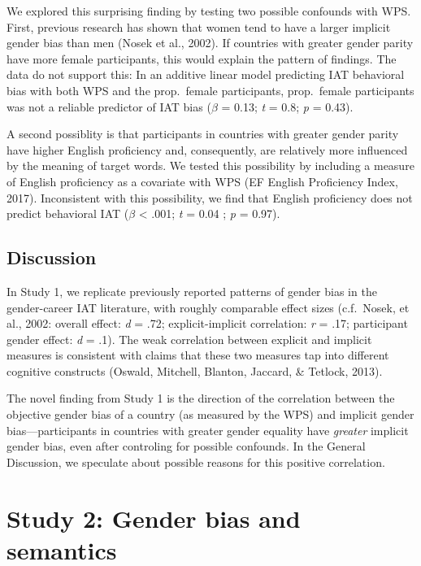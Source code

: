 \documentclass[10pt, letterpaper]{article}
\begin{document}
We explored this surprising finding by testing two possible confounds
with WPS. First, previous research has shown that women tend to have a
larger implicit gender bias than men (Nosek et al., 2002). If countries
with greater gender parity have more female participants, this would
explain the pattern of findings. The data do not support this: In an
additive linear model predicting IAT behavioral bias with both WPS and
the prop.~female participants, prop.~female participants was not a
reliable predictor of IAT bias (\(\beta\) = 0.13; \emph{t} = 0.8;
\emph{p} = 0.43).

A second possiblity is that participants in countries with greater
gender parity have higher English proficiency and, consequently, are
relatively more influenced by the meaning of target words. We tested
this possibility by including a measure of English proficiency as a
covariate with WPS (EF English Proficiency Index, 2017). Inconsistent
with this possibility, we find that English proficiency does not predict
behavioral IAT (\(\beta\) \textless{} .001; \emph{t} = 0.04 ; \emph{p} =
0.97).

\subsection{Discussion}\label{discussion}

In Study 1, we replicate previously reported patterns of gender bias in
the gender-career IAT literature, with roughly comparable effect sizes
(c.f.~Nosek, et al., 2002: overall effect: \emph{d} = .72;
explicit-implicit correlation: \emph{r} = .17; participant gender
effect: \emph{d} = .1). The weak correlation between explicit and
implicit measures is consistent with claims that these two measures tap
into different cognitive constructs (Oswald, Mitchell, Blanton, Jaccard,
\& Tetlock, 2013).

The novel finding from Study 1 is the direction of the correlation
between the objective gender bias of a country (as measured by the WPS)
and implicit gender bias---participants in countries with greater gender
equality have \emph{greater} implicit gender bias, even after controling
for possible confounds. In the General Discussion, we speculate about
possible reasons for this positive correlation.

\section{Study 2: Gender bias and
semantics}\label{study-2-gender-bias-and-semantics}
\end{document}
